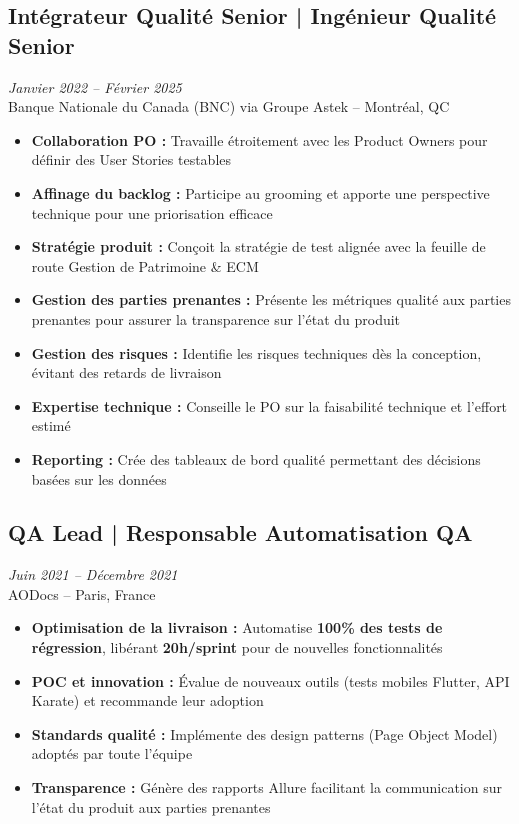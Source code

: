 \documentclass[11pt,a4paper]{article}
\newcommand{\highlight}[1]{\textcolor{primaryblue}{\textbf{#1}}}
\newcommand{\keypoint}[1]{\textbf{#1}}
\begin{document}
\subsection*{Intégrateur Qualité Senior | Ingénieur Qualité Senior } \hfill \textit{\color{mediumgray}Janvier 2022 -- Février 2025}\\
Banque Nationale du Canada (BNC) via Groupe Astek -- Montréal, QC
\begin{itemize}[leftmargin=22pt]
    \item \highlight{Collaboration PO :} Travaille étroitement avec les Product Owners pour définir des User Stories testables
    \item \highlight{Affinage du backlog :} Participe au grooming et apporte une perspective technique pour une priorisation efficace
    \item \highlight{Stratégie produit :} Conçoit la stratégie de test alignée avec la feuille de route Gestion de Patrimoine \& ECM
    \item \highlight{Gestion des parties prenantes :} Présente les métriques qualité aux parties prenantes pour assurer la transparence sur l'état du produit
    \item \highlight{Gestion des risques :} Identifie les risques techniques dès la conception, évitant des retards de livraison
    \item \highlight{Expertise technique :} Conseille le PO sur la faisabilité technique et l'effort estimé
    \item \highlight{Reporting :} Crée des tableaux de bord qualité permettant des décisions basées sur les données
\end{itemize}

\subsection*{QA Lead | Responsable Automatisation QA} \hfill \textit{\color{mediumgray}Juin 2021 -- Décembre 2021}\\
AODocs -- Paris, France
\begin{itemize}[leftmargin=22pt]
    \item \highlight{Optimisation de la livraison :} Automatise \keypoint{100\% des tests de régression}, libérant \keypoint{20h/sprint} pour de nouvelles fonctionnalités
    \item \highlight{POC et innovation :} Évalue de nouveaux outils (tests mobiles Flutter, API Karate) et recommande leur adoption
    \item \highlight{Standards qualité :} Implémente des design patterns (Page Object Model) adoptés par toute l'équipe
    \item \highlight{Transparence :} Génère des rapports Allure facilitant la communication sur l'état du produit aux parties prenantes
\end{itemize}
\end{document}
